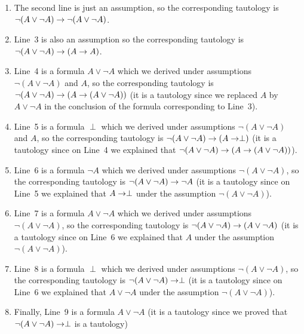 \begin{enumerate}
  \item The second line is just an assumption, so the corresponding tautology is
    $\lnot (A \lor \lnot A) \rightarrow \lnot (A \lor \lnot A)$.
  \item Line~3 is also an assumption so the corresponding tautology is
    $\lnot (A \lor \lnot A) \rightarrow (A \rightarrow A)$.
  \item Line~4 is a formula $A \lor \lnot A$ which we derived under assumptions
    $\lnot (A \lor \lnot A)$ and $A$, so the corresponding tautology is
    $\lnot (A \lor \lnot A) \rightarrow (A \rightarrow (A \lor \lnot A))$ (it is a
    tautology since we replaced $A$ by $A \lor \lnot A$ in the conclusion of
    the formula corresponding to Line~3).
  \item Line~5 is a formula $\perp$ which we derived under assumptions
    $\lnot (A \lor \lnot A)$ and $A$, so the corresponding tautology is
    $\lnot (A \lor \lnot A) \rightarrow (A \rightarrow \perp)$ (it is a
    tautology since on Line~4 we explained that $\lnot (A \lor \lnot A)
    \rightarrow (A \rightarrow (A \lor \lnot A))$).
  \item Line~6 is a formula $\lnot A$ which we derived under assumptions
    $\lnot (A \lor \lnot A)$, so the corresponding tautology is
    $\lnot (A \lor \lnot A) \rightarrow \lnot A$ (it is a
    tautology since on Line~5 we explained that $A \rightarrow \perp$ under the
    assumption $\lnot (A \lor \lnot A)$).
  \item Line~7 is a formula $A \lor \lnot A$ which we derived under assumptions
    $\lnot (A \lor \lnot A)$, so the corresponding tautology is
    $\lnot (A \lor \lnot A) \rightarrow (A \lor \lnot A)$ (it is a
    tautology since on Line~6 we explained that $A$ under the
    assumption $\lnot (A \lor \lnot A)$).
  \item Line~8 is a formula $\perp$ which we derived under assumptions
    $\lnot (A \lor \lnot A)$, so the corresponding tautology is
    $\lnot (A \lor \lnot A) \rightarrow \perp$ (it is a
    tautology since on Line~6 we explained that $A \lor \lnot A$ under the
    assumption $\lnot (A \lor \lnot A)$).
  \item Finally, Line~9 is a formula $A \lor \lnot A$ (it is a tautology since
    we proved that $\lnot (A \lor \lnot A) \rightarrow \perp$ is a tautology)
\end{enumerate}



